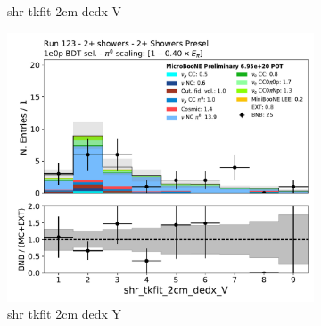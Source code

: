 \begin{figure}[H]
\begin{subfigure}{0.3\textwidth}
    \caption{shr tkfit 2cm dedx V}
    \end{subfigure}
    \begin{subfigure}{0.3\textwidth}
    \includegraphics[width=1.0\textwidth]{Sidebands/Figures/TwoShr_1e0pSel/BDT/shr_tkfit_2cm_dedx_V.pdf}
    \caption{shr tkfit 2cm dedx Y}
    \end{subfigure}
    \caption{} 
    \label{fig:HE_1eNp_1}
\end{figure}

